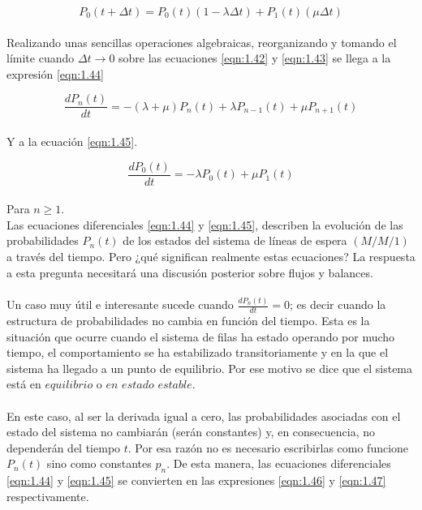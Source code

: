 \begin{equation}
    P_{0}\left ( t+\Delta t \right ) = P_{0}\left ( t \right )\left ( 1-\lambda \Delta t \right )+P_{1}\left ( t \right )\left ( \mu \Delta t \right )
    \label{eqn:1.43}
\end{equation}
\\
Realizando unas sencillas operaciones algebraicas, reorganizando y tomando el límite cuando $ \Delta t \to 0 $ sobre las ecuaciones \ref{eqn:1.42} y \ref{eqn:1.43} se llega a la expresión \ref{eqn:1.44}

\begin{equation}
    \frac{dP_{n}\left ( t \right )}{dt}=-\left ( \lambda+\mu \right )P_{n}\left ( t \right )+\lambda P_{n-1}\left ( t \right )+\mu P_{n+1}\left ( t \right )
    \label{eqn:1.44}
\end{equation}
\\
Y a la ecuación \ref{eqn:1.45}.

\begin{equation}
    \frac{dP_{0}\left ( t \right )}{dt}=-\lambda P_{0}\left ( t \right )+\mu P_{1}\left ( t \right )
    \label{eqn:1.45}
\end{equation}
\\
Para $ n \geq 1 $.
\\


Las ecuaciones diferenciales \ref{eqn:1.44} y \ref{eqn:1.45}, describen la evolución de las probabilidades $P_{n}(t)$ de los estados del sistema de líneas de espera $(M/M/1)$ a través del tiempo. Pero ¿qué significan realmente estas ecuaciones? La respuesta a esta pregunta necesitará una discusión posterior sobre flujos y balances.
\\\\
Un caso muy útil e interesante sucede cuando $\frac{dP_{n}(t)}{dt}=0$; es decir cuando la estructura de probabilidades no cambia en función del tiempo. Esta es la situación que ocurre cuando el sistema de filas ha estado operando por mucho tiempo, el comportamiento se ha estabilizado transitoriamente y en la que el sistema ha llegado a un punto de equilibrio. Por ese motivo se dice que el sistema está en $equilibrio$ o $en$ $estado$ $estable$.
\\\\
En este caso, al ser la derivada igual a cero, las probabilidades asociadas con el estado del sistema no cambiarán (serán constantes) y, en consecuencia, no dependerán del tiempo $t$. Por esa razón no
es necesario escribirlas como funcione $P_{n}\left ( t \right )$ sino como constantes $ p_{n} $. De esta manera, las
ecuaciones diferenciales \ref{eqn:1.44} y \ref{eqn:1.45} se convierten en las expresiones \ref{eqn:1.46} y \ref{eqn:1.47}
respectivamente.

